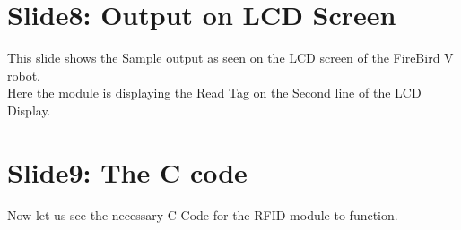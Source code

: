 \documentclass[a4paper,29.6pt]{article}
\begin{document}
\section{Slide8: Output on LCD Screen}
\begin{small}
This slide shows the Sample output as seen on the LCD screen of the FireBird V robot.\\
Here the module is displaying the Read Tag on the Second line of the LCD Display.\\

\end{small}

\section{Slide9: The C code}
\begin{small}
Now let us see the necessary C Code for the RFID module to function.
\end{small}
\end{document}

